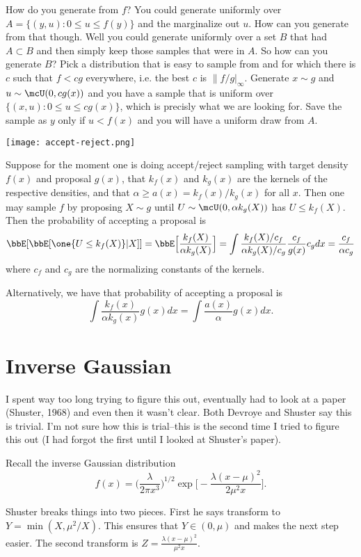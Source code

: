 \documentclass[draft]{article}
\begin{document}
How do you generate from $f$?  You could generate uniformly over $A = \{ (y,u) :
0 \leq u \leq f(y) \}$ and the marginalize out $u$.  How can you generate from
that though.  Well you could generate uniformly over a set $B$ that had $A
\subset B$ and then simply keep those samples that were in $A$.  So how can you
generate $B$?  Pick a distribution that is easy to sample from and for which
there is $c$ such that $f < cg$ everywhere, i.e. the best $c$ is
$\|f/g|_\infty$.  Generate $x \sim g$ and $u \sim \mcU(0, cg(x))$ and you have a
sample that is uniform over $\{(x,u) : 0 \leq u \leq cg(x) \}$, which is
precisly what we are looking for.  Save the sample as $y$ only if $u < f(x)$ and
you will have a uniform draw from $A$.

\texttt{[image: accept-reject.png]}

Suppose for the moment one is doing accept/reject sampling with target density
$f(x)$ and proposal $g(x)$, that $k_f(x)$ and $k_g(x)$ are the kernels of the
respective densities, and that $\alpha \geq a(x) = k_f(x) / k_g(x)$ for all $x$.
Then one may sample $f$ by proposing $X \sim g$ until $U \sim \mcU(0, \alpha
k_g(X))$ has $U \leq k_f(X)$.  Then the probability of accepting a proposal is
\[
\bbE[ \bbE[\one \{U \leq k_f(X)\} | X] ] = \bbE \Big[ \frac{k_f(X)}{\alpha
  k_g(X)} \Big] = \int \frac{k_f(X) / c_f}{\alpha k_g(X)/c_g}
\frac{c_f}{g(x)}{c_g} dx = \frac{c_f}{\alpha c_g}
\]
where $c_f$ and $c_g$ are the normalizing constants of the kernels.

Alternatively, we have that probability of accepting a proposal is
\[
\int \frac{k_f(x)}{\alpha k_g(x)} g(x) dx = \int \frac{a(x)}{\alpha} g(x) dx.
\]

\section{Inverse Gaussian}

I spent way too long trying to figure this out, eventually had to look at a
paper (Shuster, 1968) and even then it wasn't clear.  Both Devroye and Shuster
say this is trivial.  I'm not sure how this is trial--this is the second time I
tried to figure this out (I had forgot the first until I looked at Shuster's
paper).

Recall the inverse Gaussian distribution
\[
f(x) = \Big( \frac{\lambda}{2 \pi x^3} \Big)^{1/2} 
\exp \Big[ - \frac{\lambda(x-\mu)^2}{2 \mu^2 x} \Big].
\]

Shuster breaks things into two pieces. First he says transform to $Y = \min(X,
\mu^2 / X)$.  This ensures that $Y \in (0, \mu)$ and makes the next step
easier.  The second transform is $Z = \frac{\lambda (x-\mu)^2}{\mu^2 x}$.
\end{document}
